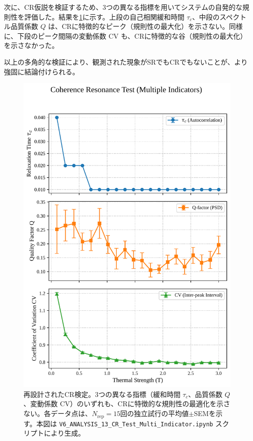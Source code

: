 \documentclass[a4paper,11pt,ja=standard,lualatex]{bxjsarticle}
\newcommand{\figref}[1]{\cref{#1}}
\begin{document}
\FloatBarrier

 次に、CR仮説を検証するため、3つの異なる指標を用いてシステムの自発的な規則性を評価した。結果を\figref{fig:cr_test_revised}に示す。上段の自己相関緩和時間 $\tau_c$、中段のスペクトル品質係数 $Q$ は、CRに特徴的なピーク（規則性の最大化）を示さない。同様に、下段のピーク間隔の変動係数 CV も、CRに特徴的な谷（規則性の最大化）を示さなかった。

以上の多角的な検証により、観測された現象がSRでもCRでもないことが、より強固に結論付けられる。

\begin{figure}[H]
\centering
\includegraphics[width=0.8\linewidth]{v6_fig02b_revised_CR_Test_Multi.pdf}
\caption{再設計されたCR検定。3つの異なる指標（緩和時間 $\tau_c$、品質係数 $Q$、変動係数 CV）のいずれも、CRに特徴的な規則性の最適化を示さない。各データ点は、$N_{\mathrm{rep}}=15$回の独立試行の平均値$\pm$SEMを示す。本図は \texttt{V6\_ANALYSIS\_13\_CR\_Test\_Multi\_Indicator.ipynb} スクリプトにより生成。}
\label{fig:cr_test_revised}
\end{figure}

\FloatBarrier
\end{document}
